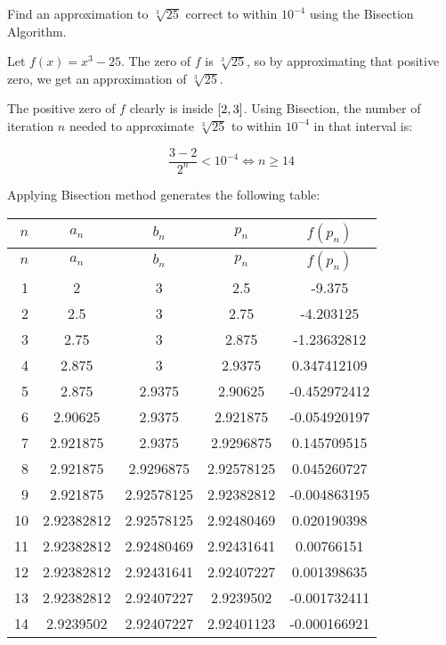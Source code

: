 \documentclass[../../../../Assignments.tex]{subfiles}
\begin{document}
\begin{exercise}
    Find an approximation to \(\sqrt[3]{25}\) correct to within \(10^{-4}\)
    using the Bisection Algorithm.
\end{exercise}

\begin{solution}
    Let \(f(x) = x^3 - 25\). The zero of \(f\) is \(\sqrt[3]{25}\), so by
    approximating that positive zero, we get an approximation of
    \(\sqrt[3]{25}\).

    The positive zero of \(f\) clearly is inside \(\interval{2}{3}\). Using
    Bisection, the number of iteration \(n\) needed to approximate
    \(\sqrt[3]{25}\) to within \(10^{-4}\) in that interval is:

    \[\frac{3 - 2}{2^n} < 10^{-4} \iff n \geq 14\]

    Applying Bisection method generates the following table:

    \begin{longtable}{r S[table-format=1.8] S[table-format=1.8] S[table-format=1.8] S[table-format=-1.9]}
        \toprule
        \(n\)  &   {\(a_n\)}   &   {\(b_n\)}   &   {\(p_n\)}   &  {\(f(p_n)\)}  \\
        \midrule
        \endfirsthead
        \(n\)  &   {\(a_n\)}   &   {\(b_n\)}   &   {\(p_n\)}   &  {\(f(p_n)\)}  \\
        \midrule
          &  2            &  3            &  2.5          &  -9.375        \\
            2  &  2.5          &  3            &  2.75         &  -4.203125     \\
            3  &  2.75         &  3            &  2.875        &  -1.23632812   \\
            4  &  2.875        &  3            &  2.9375       &   0.347412109  \\
            5  &  2.875        &  2.9375       &  2.90625      &  -0.452972412  \\
            6  &  2.90625      &  2.9375       &  2.921875     &  -0.054920197  \\
            7  &  2.921875     &  2.9375       &  2.9296875    &   0.145709515  \\
            8  &  2.921875     &  2.9296875    &  2.92578125   &   0.045260727  \\
            9  &  2.921875     &  2.92578125   &  2.92382812   &  -0.004863195  \\
           10  &  2.92382812   &  2.92578125   &  2.92480469   &   0.020190398  \\
           11  &  2.92382812   &  2.92480469   &  2.92431641   &   0.00766151   \\
           12  &  2.92382812   &  2.92431641   &  2.92407227   &   0.001398635  \\
           13  &  2.92382812   &  2.92407227   &  2.9239502    &  -0.001732411  \\
           14  &  2.9239502    &  2.92407227   &  2.92401123   &  -0.000166921  \\
       \bottomrule
    \end{longtable}


\end{solution}
\end{document}
